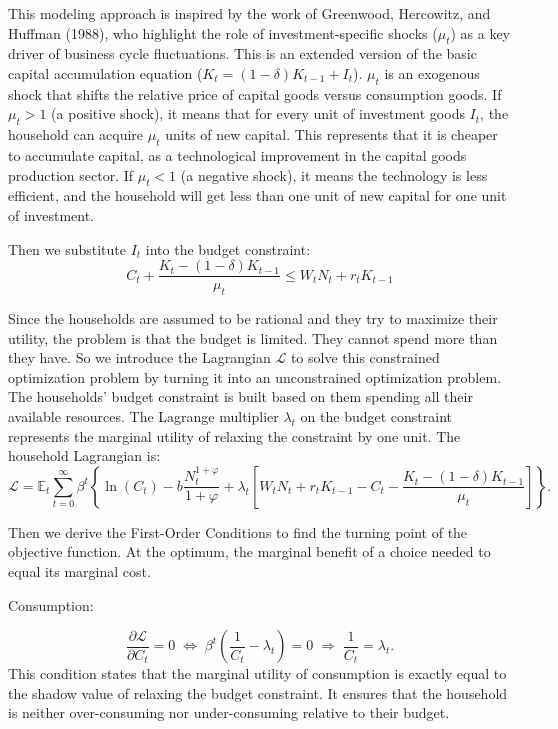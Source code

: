 \documentclass[12pt]{article}
\begin{document}
This modeling approach is inspired by the work of Greenwood, Hercowitz, and Huffman (1988), who highlight the role of investment-specific shocks ($\mu_t$) as a key driver of business cycle fluctuations. This is an extended version of the basic capital accumulation equation ($K_t = (1 - \delta) K_{t-1} + I_t$). $\mu_t$ is an exogenous shock that shifts the relative price of capital goods versus consumption goods. If $\mu_t > 1$ (a positive shock), it means that for every unit of investment goods $I_t$, the household can acquire $\mu_t$ units of new capital. This represents that it is cheaper to accumulate capital, as a technological improvement in the capital goods production sector. If $\mu_t < 1$ (a negative shock), it means the technology is less efficient, and the household will get less than one unit of new capital for one unit of investment.

Then we substitute $I_t$ into the budget constraint:
\[
C_t + \frac{K_t - (1-\delta)K_{t-1}}{\mu_t}
\le W_t N_t + r_t K_{t-1}
\]

Since the households are assumed to be rational and they try to maximize their utility, the problem is that the budget is limited. They cannot spend more than they have. So we introduce the Lagrangian $\mathcal{L}$ to solve this constrained optimization problem by turning it into an unconstrained optimization problem. The households' budget constraint is built based on them spending all their available resources. The Lagrange multiplier $\lambda_t$ on the budget constraint represents the marginal utility of relaxing the constraint by one unit.   
The household Lagrangian is:
\[
\mathcal{L}
=
\mathbb{E}_{t}
\sum_{t=0}^{\infty} \beta^{t}
\left\{
\ln(C_{t})
-
b\frac{N_{t}^{1+\varphi}}{1+\varphi}
+
\lambda_{t}
\left[
W_{t}N_{t}
+ r_{t}K_{t-1}
- C_{t}
- \frac{K_{t} - (1-\delta)K_{t-1}}{\mu_{t}}
\right]
\right\}.
\tag{8}
\]

Then we derive the First-Order Conditions to find the turning point of the objective function.  At the optimum, the marginal benefit of a choice needed to equal its marginal cost.

Consumption:

\[
\frac{\partial \mathcal{L}}{\partial C_t} = 0 
\;\Longleftrightarrow\;
\beta^{t}\!\left(\frac{1}{C_t} - \lambda_t\right) = 0
\;\Longrightarrow\;
\frac{1}{C_t} = \lambda_t.
\tag{9}
\]
This condition states that the marginal utility of consumption is exactly equal to the shadow value of relaxing the budget constraint. It ensures that the household is neither over-consuming nor under-consuming relative to their budget.
\end{document}
